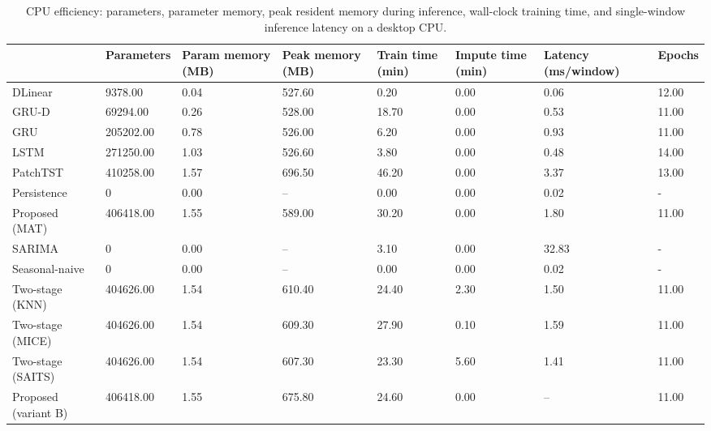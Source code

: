 \begin{table}
\caption{CPU efficiency: parameters, parameter memory, peak resident memory during inference, wall-clock training time, and single-window inference latency on a desktop CPU.}
\label{tab:efficiency}
\begin{tabular}{llllllll}
\toprule
 & Parameters & Param memory (MB) & Peak memory (MB) & Train time (min) & Impute time (min) & Latency (ms/window) & Epochs \\
\midrule
DLinear & 9378.00 & 0.04 & 527.60 & 0.20 & 0.00 & 0.06 & 12.00 \\
GRU-D & 69294.00 & 0.26 & 528.00 & 18.70 & 0.00 & 0.53 & 11.00 \\
GRU & 205202.00 & 0.78 & 526.00 & 6.20 & 0.00 & 0.93 & 11.00 \\
LSTM & 271250.00 & 1.03 & 526.60 & 3.80 & 0.00 & 0.48 & 14.00 \\
PatchTST & 410258.00 & 1.57 & 696.50 & 46.20 & 0.00 & 3.37 & 13.00 \\
Persistence & 0 & 0.00 & -- & 0.00 & 0.00 & 0.02 & - \\
Proposed (MAT) & 406418.00 & 1.55 & 589.00 & 30.20 & 0.00 & 1.80 & 11.00 \\
SARIMA & 0 & 0.00 & -- & 3.10 & 0.00 & 32.83 & - \\
Seasonal-naive & 0 & 0.00 & -- & 0.00 & 0.00 & 0.02 & - \\
Two-stage (KNN) & 404626.00 & 1.54 & 610.40 & 24.40 & 2.30 & 1.50 & 11.00 \\
Two-stage (MICE) & 404626.00 & 1.54 & 609.30 & 27.90 & 0.10 & 1.59 & 11.00 \\
Two-stage (SAITS) & 404626.00 & 1.54 & 607.30 & 23.30 & 5.60 & 1.41 & 11.00 \\
Proposed (variant B) & 406418.00 & 1.55 & 675.80 & 24.60 & 0.00 & -- & 11.00 \\
\bottomrule
\end{tabular}
\end{table}
